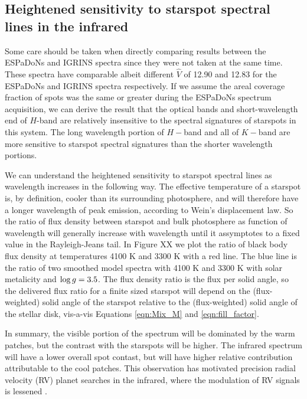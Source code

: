 \documentclass[onecolumn]{emulateapj}%
\begin{document}
\subsection{Heightened sensitivity to starspot spectral lines in the infrared}

Some care should be taken when directly comparing results between the ESPaDoNs and IGRINS spectra since they were not taken at the same time.  These spectra have comparable albeit different $\hat V$ of 12.90 and 12.83 for the ESPaDoNs and IGRINS spectra respectively.  If we assume the areal coverage fraction of spots was the same or greater during the ESPaDoNs spectrum acquisition, we can derive the result that the optical bands and short-wavelength end of $H$-band are relatively insensitive to the spectral signatures of starspots in this system.  The long wavelength portion of $H-$band and all of $K-$band are more sensitive to starspot spectral signatures than the shorter wavelength portions.

We can understand the heightened sensitivity to starspot spectral lines as wavelength increases in the following way.  The effective temperature of a starspot is, by definition, cooler than its surrounding photosphere, and will therefore have a longer wavelength of peak emission, according to Wein's displacement law.  So the ratio of flux density between starspot and bulk photosphere as function of wavelength will generally increase with wavelength until it assymptotes to a fixed value in the Rayleigh-Jeans tail.  In Figure XX we plot the ratio of black body flux density at temperatures 4100 K and 3300 K with a red line.  The blue line is the ratio of two smoothed \PHOENIX model spectra with 4100 K and 3300 K with solar metalicity and $\log g=3.5$.  The flux density ratio is the flux per solid angle, so the delivered flux ratio for a finite sized starspot will depend on the (flux-weighted) solid angle of the starspot relative to the (flux-weighted) solid angle of the stellar disk, vis-a-vis Equations \ref{eqn:Mix_M} and \ref{eqn:fill_factor}.  



In summary, the visible portion of the spectrum will be dominated by the warm patches, but the contrast with the starspots will be higher.  The infrared spectrum will have a lower overall spot contast, but will have higher relative contribution attributable to the cool patches.  This observation has motivated precision radial velocity (RV) planet searches in the infrared, where the modulation of RV signals is lessened \citep{2008ApJ...687L.103P}.  
\end{document}
